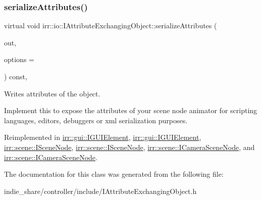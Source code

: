 \subsubsection{\texorpdfstring{serialize\+Attributes()}{serializeAttributes()}\hspace{0.1cm}{\footnotesize\ttfamily [2/2]}}
{\footnotesize\ttfamily virtual void irr\+::io\+::\+I\+Attribute\+Exchanging\+Object\+::serialize\+Attributes (\begin{DoxyParamCaption}\item[{\hyperlink{classirr_1_1io_1_1IAttributes}{io\+::\+I\+Attributes} $\ast$}]{out,  }\item[{\hyperlink{structirr_1_1io_1_1SAttributeReadWriteOptions}{io\+::\+S\+Attribute\+Read\+Write\+Options} $\ast$}]{options = {} }\end{DoxyParamCaption}) const\hspace{0.3cm}{\ttfamily [inline]}, {\ttfamily [virtual]}}



Writes attributes of the object. 

Implement this to expose the attributes of your scene node animator for scripting languages, editors, debuggers or xml serialization purposes. 

Reimplemented in \hyperlink{classirr_1_1gui_1_1IGUIElement_ac575f2f817b05733dbc667ff298f6e78}{irr\+::gui\+::\+I\+G\+U\+I\+Element}, \hyperlink{classirr_1_1gui_1_1IGUIElement_ac575f2f817b05733dbc667ff298f6e78}{irr\+::gui\+::\+I\+G\+U\+I\+Element}, \hyperlink{classirr_1_1scene_1_1ISceneNode_a3210345b70227c03c7f889c94754fdaa}{irr\+::scene\+::\+I\+Scene\+Node}, \hyperlink{classirr_1_1scene_1_1ISceneNode_a3210345b70227c03c7f889c94754fdaa}{irr\+::scene\+::\+I\+Scene\+Node}, \hyperlink{classirr_1_1scene_1_1ICameraSceneNode_a0a78a29638be1665ee5dba22c2c3b846}{irr\+::scene\+::\+I\+Camera\+Scene\+Node}, and \hyperlink{classirr_1_1scene_1_1ICameraSceneNode_a0a78a29638be1665ee5dba22c2c3b846}{irr\+::scene\+::\+I\+Camera\+Scene\+Node}.



The documentation for this class was generated from the following file\+:\begin{DoxyCompactItemize}
\item 
indie\+\_\+share/controller/include/I\+Attribute\+Exchanging\+Object.\+h\end{DoxyCompactItemize}
